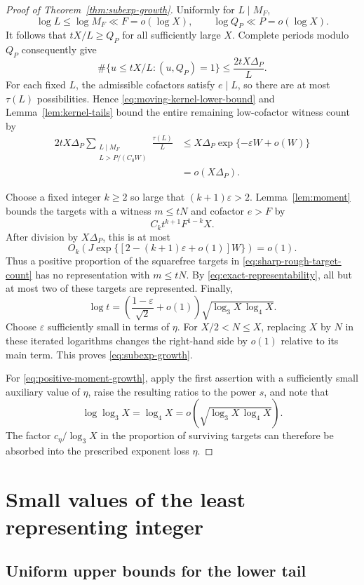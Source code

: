 \documentclass[11pt]{article}
\theoremstyle{remark}
\newcommand{\1}{\mathbf 1}
\begin{document}
\begin{proof}[Proof of Theorem~\ref{thm:subexp-growth}]
Uniformly for $L\mid M_F$,
\[
 \log L\leq\log M_F\ll F=o(\log X),
 \qquad \log Q_P\ll P=o(\log X).
\]
It follows that $tX/L\geq Q_P$ for all sufficiently large $X$.  Complete
periods modulo $Q_P$ consequently give
\[
 \#\{u\leq tX/L:(u,Q_P)=1\}
 \leq\frac{2tX\Delta_P}{L}.
\]
For each fixed $L$, the admissible cofactors satisfy $e\mid L$, so there are
at most $\tau(L)$ possibilities.  Hence \eqref{eq:moving-kernel-lower-bound}
and Lemma~\ref{lem:kernel-tails} bound the entire remaining low-cofactor
witness count by
\begin{align*}
 2tX\Delta_P
     \sum_{\substack{L\mid M_F\\L>P/(C_0W)}}\frac{\tau(L)}L
 &\leq X\Delta_P\exp\{-\varepsilon W+o(W)\}\\
 &=o(X\Delta_P).
\end{align*}

Choose a fixed integer $k\geq2$ so large that $(k+1)\varepsilon>2$.
Lemma~\ref{lem:moment} bounds the targets with a witness $m\leq tN$ and
cofactor $e>F$ by
\[
 C_kt^{k+1}F^{1-k}X.
\]
After division by $X\Delta_P$, this is at most
\[
 O_k\left(J\exp\{[2-(k+1)\varepsilon+o(1)]W\}\right)=o(1).
\]
Thus a positive proportion of the squarefree targets in
\eqref{eq:sharp-rough-target-count} has no representation with $m\leq tN$.
By \eqref{eq:exact-representability}, all but at most two of these targets
are represented.  Finally,
\[
 \log t
 =\left(\frac{1-\varepsilon}{\sqrt2}+o(1)\right)
          \sqrt{\log_3X\,\log_4X}.
\]
Choose $\varepsilon$ sufficiently small in terms of $\eta$.  For
$X/2<N\leq X$, replacing $X$ by $N$ in these iterated logarithms changes
the right-hand side by $o(1)$ relative to its main term.  This proves
\eqref{eq:subexp-growth}.

For \eqref{eq:positive-moment-growth}, apply the first assertion with a
sufficiently small auxiliary value of $\eta$, raise the resulting ratios to
the power $s$, and note that
\[
 \log\log_3X=\log_4X
 =o\left(\sqrt{\log_3X\,\log_4X}\right).
\]
The factor $c_\eta/\log_3X$ in the proportion of surviving targets can
therefore be absorbed into the prescribed exponent loss $\eta$.
\end{proof}

\section{Small values of the least representing integer}\label{sec:small-values}

\subsection{Uniform upper bounds for the lower tail}
\end{document}
